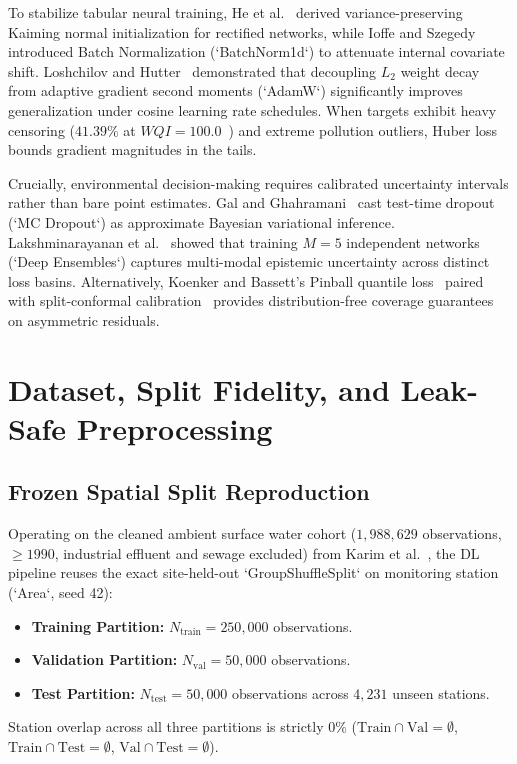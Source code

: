 \documentclass[journal,10pt,twocolumn]{IEEEtran}
\begin{document}
To stabilize tabular neural training, He et al.~\cite{he2015delving} derived variance-preserving Kaiming normal initialization for rectified networks, while Ioffe and Szegedy~\cite{ioffe2015batch} introduced Batch Normalization (`BatchNorm1d`) to attenuate internal covariate shift. Loshchilov and Hutter~\cite{loshchilov2019decoupled} demonstrated that decoupling $L_2$ weight decay from adaptive gradient second moments (`AdamW`) significantly improves generalization under cosine learning rate schedules. When targets exhibit heavy censoring ($41.39\%$ at $WQI=100.0$~\cite{tobin1958estimation}) and extreme pollution outliers, Huber loss~\cite{huber1964robust} bounds gradient magnitudes in the tails.

Crucially, environmental decision-making requires calibrated uncertainty intervals rather than bare point estimates. Gal and Ghahramani~\cite{gal2016dropout} cast test-time dropout (`MC Dropout`) as approximate Bayesian variational inference. Lakshminarayanan et al.~\cite{lakshminarayanan2017simple} showed that training $M=5$ independent networks (`Deep Ensembles`) captures multi-modal epistemic uncertainty across distinct loss basins. Alternatively, Koenker and Bassett's Pinball quantile loss~\cite{koenker1978regression} paired with split-conformal calibration~\cite{romano2019conformalized, angelopoulos2021gentle} provides distribution-free coverage guarantees on asymmetric residuals.

\section{Dataset, Split Fidelity, and Leak-Safe Preprocessing}
\subsection{Frozen Spatial Split Reproduction}
Operating on the cleaned ambient surface water cohort ($1,988,629$ observations, $\ge 1990$, industrial effluent and sewage excluded) from Karim et al.~\cite{karim2025comprehensive}, the DL pipeline reuses the exact site-held-out `GroupShuffleSplit` on monitoring station (`Area`, seed 42):
\begin{itemize}
    \item \textbf{Training Partition:} $N_{\text{train}} = 250,000$ observations.
    \item \textbf{Validation Partition:} $N_{\text{val}} = 50,000$ observations.
    \item \textbf{Test Partition:} $N_{\text{test}} = 50,000$ observations across $4,231$ unseen stations.
\end{itemize}
Station overlap across all three partitions is strictly $0\%$ ($\text{Train} \cap \text{Val} = \emptyset$, $\text{Train} \cap \text{Test} = \emptyset$, $\text{Val} \cap \text{Test} = \emptyset$).
\end{document}
